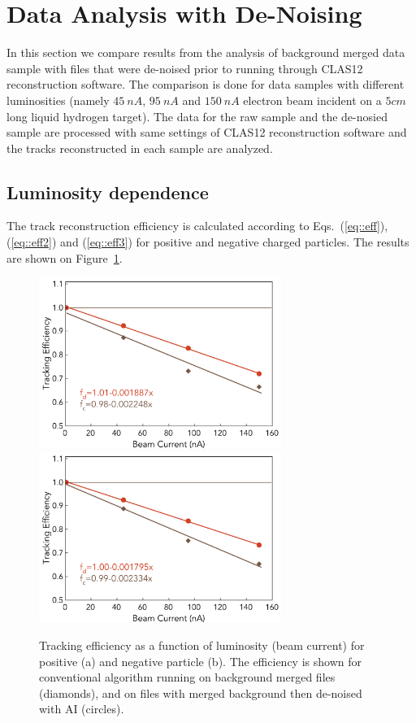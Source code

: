 \section{Data Analysis with De-Noising}

In this section we compare results from the analysis of background merged data sample with files that were de-noised prior to running through CLAS12 reconstruction software. The comparison is done for data samples with different luminosities (namely $45~nA$, $95~nA$ and $150~nA$ electron beam incident on a $5cm$ long liquid hydrogen target). The data for the raw sample and the de-nosied sample are processed with same settings of CLAS12 reconstruction software and the tracks reconstructed in each sample are analyzed.

\subsection{Luminosity dependence}

The track reconstruction efficiency is calculated according to Eqs.~(\ref{eq::eff}), (\ref{eq::eff2}) and (\ref{eq::eff3}) for positive and negative charged particles. The results are shown on Figure~\ref{lscan::conv_dn}. 

\begin{figure}[!h]
\begin{center}
 \includegraphics[width=3.1in]{images/figure_lscan_pos.pdf}
 \includegraphics[width=3.1in]{images/figure_lscan_neg.pdf}
\caption {Tracking efficiency as a function of luminosity (beam current) for positive (a) and negative particle (b).  The efficiency is shown for
conventional algorithm running on background merged files (diamonds), and on files with merged background then de-noised with AI (circles).}
 \label{lscan::conv_dn}
 \end{center}
\end{figure}

